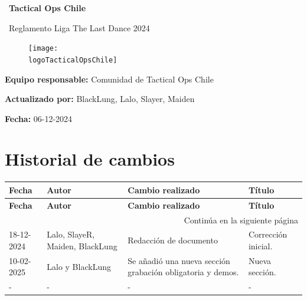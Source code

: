 \documentclass[a4paper, 11pt]{article}
\newcommand{\logoTacticalOpsChile}{img/logo_tacticalops.png}
\newcommand{\nombreInforme}{Tactical Ops Chile}
\begin{document}
\rfoot[]{\thepage} %

    \begin{titlepage}
        \begin{center}
            {\Huge\ \textbf{\nombreInforme}}\par
            {\huge\ Reglamento Liga The Last Dance 2024}\par          
        \end{center}

        \vfill

        \begin{figure}[htb]
            \centering
            \texttt{[image: \\logoTacticalOpsChile]}
        \end{figure} 
        
        \vfill

        \textbf{Equipo responsable: } Comunidad de Tactical Ops Chile\par\vspace{0.2cm}
        \textbf{Actualizado por: } BlackLung, Lalo, Slayer, Maiden\par\vspace{0.2cm}
        \textbf{Fecha: } 06-12-2024\par\vspace{0.3cm}

    \end{titlepage}
    \clearpage

    \tableofcontents
    \clearpage


    \section{Historial de cambios}
    
    \begin{longtable}{|p{2.5cm}|p{3.5cm}|p{6cm}|p{3cm}|}
        \hline
        \textbf{Fecha} & \textbf{Autor} & \textbf{Cambio realizado} & \textbf{Título} \\
        \hline
        \endfirsthead
        
        \hline
        \textbf{Fecha} & \textbf{Autor} & \textbf{Cambio realizado} & \textbf{Título} \\
        \hline
        \endhead
    
        \hline
        \multicolumn{4}{|r|}{Continúa en la siguiente página} \\
        \hline
        \endfoot
    
        \hline
        \endlastfoot
    
        18-12-2024 & Lalo, SlayeR, Maiden, BlackLung & Redacción de documento & Corrección inicial. \\ 
        \hline
        10-02-2025 & Lalo y BlackLung & Se añadió una nueva sección grabación obligatoria y demos. & Nueva sección. \\ 
        \hline
        - & - & - & - \\ 
        \hline
    \end{longtable}
    \clearpage
\end{document}
